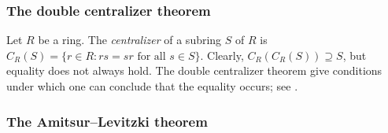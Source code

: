 %





\subsubsection*{The double centralizer theorem}

Let $R$ be a ring. 
The \emph{centralizer} of a subring $S$ of $R$ 
is 
$C_R(S)=\{r\in R: rs=sr\text{ for all $s\in S$}\}$. 
Clearly, $C_R(C_R(S))\supseteq S$, but equality does not always hold. 
The double centralizer theorem give conditions under which one can conclude that the equality occurs; see \cite[Chapter 4]{MR3308118}. 

\subsubsection*{The Amitsur--Levitzki theorem}

